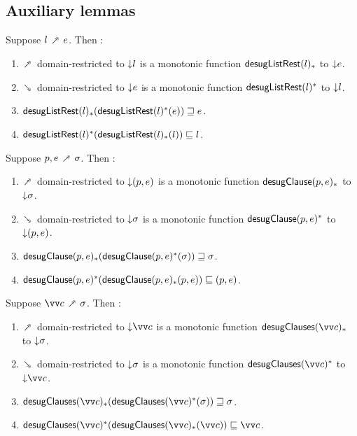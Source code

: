 \subsection{Auxiliary lemmas}

\begin{lemma}
  \label{lem:aux:desugarlistrest:gc}
  Suppose $l \dfwdarrow e$. Then :
  \begin{enumerate}
     \item $\dfwdarrow$ domain-restricted to ${\downarrow}{l}$ is a monotonic function $\mathsf{desugListRest}(l)_*$ to ${\downarrow}{e}$.
     \item $\dbwdarrow$ domain-restricted to ${\downarrow}{e}$ is a monotonic function $\mathsf{desugListRest}(l)^*$ to ${\downarrow}{l}$.
     \item $\mathsf{desugListRest}(l)_*(\mathsf{desugListRest}(l)^*(e)) \sqsupseteq e$.
     \item $\mathsf{desugListRest}(l)^*(\mathsf{desugListRest}(l)_*(l)) \sqsubseteq l$.
  \end{enumerate}
\end{lemma}
\begin{lemma}
  \label{lem:aux:clause:gc}
  Suppose $p, e \dfwdarrow \sigma$. Then :
  \begin{enumerate}
     \item $\dfwdarrow$ domain-restricted to ${\downarrow}{(p, e)}$ is a monotonic function $\mathsf{desugClause}(p, e)_*$ to ${\downarrow}{\sigma}$.
     \item $\dbwdarrow$ domain-restricted to ${\downarrow}{\sigma}$ is a monotonic function $\mathsf{desugClause}(p, e)^*$ to ${\downarrow}{(p, e)}$.
     \item $\mathsf{desugClause}(p, e)_*(\mathsf{desugClause}(p, e)^*(\sigma)) \sqsupseteq \sigma$.
     \item $\mathsf{desugClause}(p, e)^*(\mathsf{desugClause}(p, e)_*(p, e)) \sqsubseteq (p, e)$.
  \end{enumerate}
\end{lemma}
\begin{lemma}
  \label{lem:aux:clauses:gc}
  Suppose $\vec{c} \dfwdarrow \sigma$. Then :
  \begin{enumerate}
     \item $\dfwdarrow$ domain-restricted to $\Below{\vec{c}}$ is a monotonic function $\desugarClausesFwdF{\vec{c}}$ to ${\downarrow}{\sigma}$.
     \item $\dbwdarrow$ domain-restricted to ${\downarrow}{\sigma}$ is a monotonic function $\desugarClausesBwdF{\vec{c}}$ to $\Below{\vec{c}}$.
     \item $\desugarClausesFwdF{\vec{c}}(\desugarClausesBwdF{\vec{c}}(\sigma)) \geq \sigma$.
     \item $\desugarClausesBwdF{\vec{c}}(\desugarClausesFwdF{\vec{c}}(\vec{c})) \leq \vec{c}$.
  \end{enumerate}
\end{lemma}
